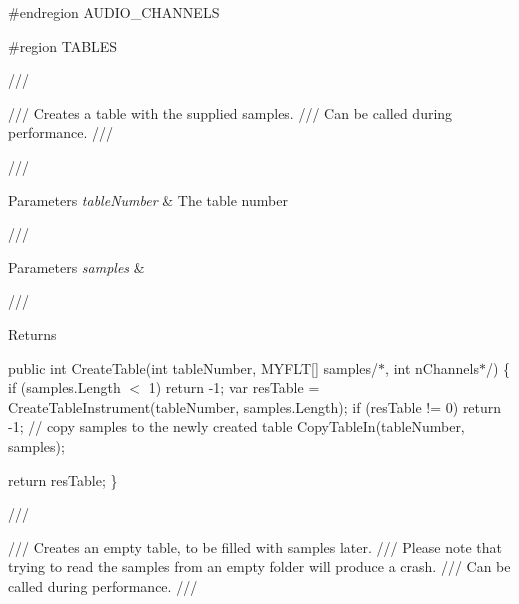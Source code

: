 \#endregion AUDIO\+\_\+\+CHANNELS

\#region TABLES

/// 

/// Creates a table with the supplied samples. /// Can be called during performance. /// 

/// 
\begin{DoxyParams}{Parameters}
{\em table\+Number} & The table number\\
\hline
\end{DoxyParams}
/// 
\begin{DoxyParams}{Parameters}
{\em samples} & \\
\hline
\end{DoxyParams}
/// \begin{DoxyReturn}{Returns}

\end{DoxyReturn}
public int Create\+Table(int table\+Number, MYFLT\mbox{[}\mbox{]} samples/$\ast$, int n\+Channels$\ast$/) \{ if (samples.\+Length \texorpdfstring{$<$}{<} 1) return -\/1; var res\+Table = Create\+Table\+Instrument(table\+Number, samples.\+Length); if (res\+Table != 0) return -\/1; // copy samples to the newly created table Copy\+Table\+In(table\+Number, samples);

return res\+Table; \}

/// 

/// Creates an empty table, to be filled with samples later. /// Please note that trying to read the samples from an empty folder will produce a crash. /// Can be called during performance. /// 

